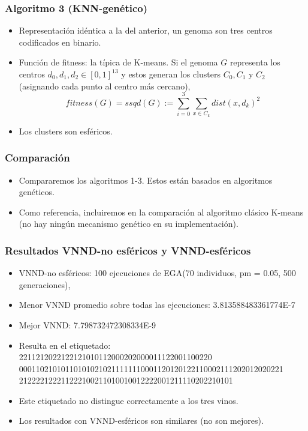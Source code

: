 \documentclass[11pt]{beamer}
\begin{document}
\begin{frame}[fragile]
    \frametitle{Algoritmo 3 (KNN-genético)}
        \begin{itemize}
            \item Representación idéntica a la del anterior, un genoma son tres centros codificados en binario. 
            \item Función de fitness: la típica de K-means. Si el genoma $G$ representa los centros $d_0,
            d_1,d_2\in [0,1]^{13}$ y estos generan los clusters $C_0,C_1$ y $C_2$ (asignando cada punto al centro más
                cercano), 
                \[ fitness(G)=ssqd(G) := \sum _{i = 0}^3 \sum_{x\in C_k} dist(x,d_k)^2\]
            \item  Los clusters son esféricos.
        \end{itemize}

\end{frame}
\begin{frame}[fragile]
    \frametitle{Comparación}
        \begin{itemize}
            \item Compararemos los algoritmos 1-3. Estos están basados en algoritmos genéticos.
            \item Como referencia, incluiremos en la comparación al algoritmo clásico K-means (no hay ningún mecanismo
                    genético en su implementación). 
        \end{itemize}

\end{frame}

    \begin{frame}
        \frametitle{Resultados VNND-no esféricos y VNND-esféricos}
    \begin{itemize}
        \item VNND-no esféricos: 100 ejecuciones  de EGA(70 individuos, pm = 0.05, 500 generaciones), 
        \item Menor VNND promedio sobre todas las ejecuciones:  3.813588483361774E-7
        \item Mejor VNND: 7.798732472308334E-9
        \item Resulta en el etiquetado: \\
       {\scriptsize 2211212022122121010112000202000011122001100220
        000110210101101010210211111110001120120122110002111202012020221
    212222122211222100211010010012222001211110202210101}

        \item Este etiquetado no distingue correctamente a los tres vinos. 
            \pause
        \item Los resultados con VNND-esféricos son similares (no son mejores).
    \end{itemize}
        \end{frame}
\end{document}
